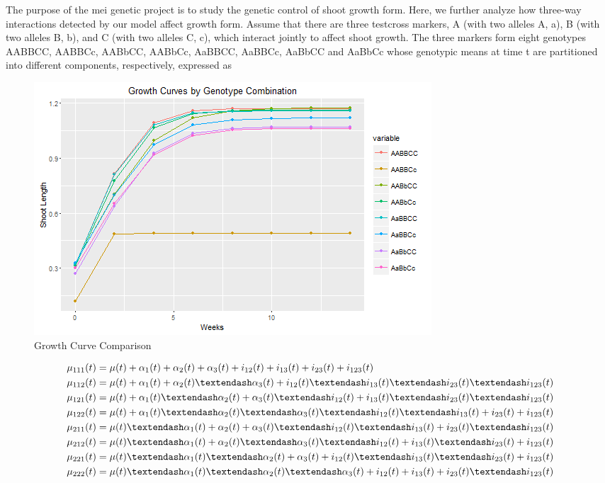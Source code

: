 \documentclass[11pt,]{book}
\theoremstyle{definition}
\theoremstyle{definition}
\theoremstyle{remark}
\begin{document}
The purpose of the mei genetic project is to study the genetic control
of shoot growth form. Here, we further analyze how three-way
interactions detected by our model affect growth form. Assume that there
are three testcross markers, A (with two alleles A, a), B (with two
alleles B, b), and C (with two alleles C, c), which interact jointly to
affect shoot growth. The three markers form eight genotypes AABBCC,
AABBCc, AABbCC, AABbCc, AaBBCC, AaBBCc, AaBbCC and AaBbCc whose
genotypic means at time t are partitioned into different components,
respectively, expressed as

\begin{figure}

{\centering \includegraphics[width=0.8\linewidth]{images/GrowthCurveComparison} 

}

\caption{Growth Curve Comparison}\label{fig:growth-compare}
\end{figure}

\begin{align}
\mu_{111}(t) &= \mu(t) + \alpha_1(t) + \alpha_2(t) + \alpha_3(t) + i_{12}(t) + i_{13}(t) + i_{23}(t) + i_{123}(t)  \notag \\
\mu_{112}(t) &= \mu(t) + \alpha_1(t) + \alpha_2(t) – \alpha_3(t) + i_{12}(t) – i_{13}(t) – i_{23}(t) – i_{123}(t)  \notag \\
\mu_{121}(t) &= \mu(t) + \alpha_1(t) – \alpha_2(t) + \alpha_3(t) – i_{12}(t) + i_{13}(t) – i_{23}(t) – i_{123}(t)  \notag \\
\mu_{122}(t) &= \mu(t) + \alpha_1(t) – \alpha_2(t) – \alpha_3(t) – i_{12}(t) – i_{13}(t) + i_{23}(t) + i_{123}(t)  \notag \\
\mu_{211}(t) &= \mu(t) – \alpha_1(t) + \alpha_2(t) + \alpha_3(t) – i_{12}(t) – i_{13}(t) + i_{23}(t) – i_{123}(t)  \notag \\
\mu_{212}(t) &= \mu(t) – \alpha_1(t) + \alpha_2(t) – \alpha_3(t) – i_{12}(t) + i_{13}(t) – i_{23}(t) + i_{123}(t)  \notag \\
\mu_{221}(t) &= \mu(t) – \alpha_1(t) – \alpha_2(t) + \alpha_3(t) + i_{12}(t) – i_{13}(t) – i_{23}(t) + i_{123}(t)  \notag \\
\mu_{222}(t) &= \mu(t) – \alpha_1(t) – \alpha_2(t) – \alpha_3(t) + i_{12}(t) + i_{13}(t) + i_{23}(t) – i_{123}(t)
\label{eq:genetic-effects}
\end{align}
\end{document}
